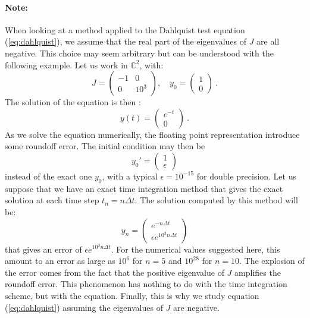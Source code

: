         \paragraph{Note:}
        When looking at a method applied to the Dahlquist test equation (\ref{eq:dahlquist}), we assume that the real part of the eigenvalues of $J$ are all negative.
        This choice may seem arbitrary but can be understood with the following example.
        Let us work in $\mathbb{C}^2$, with:
        \begin{equation}
          J = \begin{pmatrix} -1 & 0 \\ 0 & 10^3 \end{pmatrix}, \quad y_0 = \begin{pmatrix} 1 \\ 0 \end{pmatrix} \ .
        \end{equation}
        The solution of the equation is then :
        \begin{equation}
          y\left(t\right) = \begin{pmatrix} e^{-t} \\ 0 \end{pmatrix} \ .
        \end{equation}
        As we solve the equation numerically, the floating point representation introduce some roundoff error.
        The initial condition may then be
        \begin{equation}
          y_0' = \begin{pmatrix} 1 \\ \epsilon \end{pmatrix}
        \end{equation}
        instead of the exact one $y_0$, with a typical $\epsilon = 10^{-15}$ for double precision.
        Let us suppose that we have an exact time integration method that gives the exact solution at each time step $t_n = n\Delta t$.
        The solution computed by this method will be:
        \begin{equation}
          y_n = \begin{pmatrix} e^{-n\Delta t} \\ \epsilon e^{10^3 n \Delta t} \end{pmatrix}
        \end{equation}
        that gives an error of $\epsilon e^{10^3 n\Delta t}$.
        For the numerical values suggested here, this amount to an error as large as $10^6$ for $n = 5$ and $10^{28}$ for $n = 10$.
        The explosion of the error comes from the fact that the positive eigenvalue of $J$ amplifies the roundoff error.
        This phenomenon has nothing to do with the time integration scheme, but with the equation.
        Finally, this is why we study equation (\ref{eq:dahlquist}) assuming the eigenvalues of $J$ are negative.


